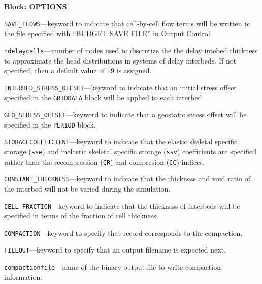 
\item \textbf{Block: OPTIONS}

\begin{description}
\item \texttt{SAVE\_FLOWS}---keyword to indicate that cell-by-cell flow terms will be written to the file specified with ``BUDGET SAVE FILE'' in Output Control.

\item \texttt{ndelaycells}---number of nodes used to discretize the the delay intebed thickness to approximate the head distributions in systems of delay interbeds. If not specified, then a default value of 19 is assigned.

\item \texttt{INTERBED\_STRESS\_OFFSET}---keyword to indicate that an initial stress offset specified in the \texttt{GRIDDATA} block will be applied to each interbed.

\item \texttt{GEO\_STRESS\_OFFSET}---keyword to indicate that a geostatic stress offset will be specified in the \texttt{PERIOD} block.

\item \texttt{STORAGECOEFFICIENT}---keyword to indicate that the elastic skeletal specific storage (\texttt{sse}) and inelastic skeletal specific storage (\texttt{ssv}) coefficients are specified rather than the recompression (\texttt{CR}) and compresion (\texttt{CC}) indices.

\item \texttt{CONSTANT\_THICKNESS}---keyword to indicate that the thickness and void ratio of the interbed will not be varied during the simulation.

\item \texttt{CELL\_FRACTION}---keyword to indicate that the thickness of interbeds will be specified in terms of the fraction of cell thickness.

\item \texttt{COMPACTION}---keyword to specify that record corresponds to the compaction.

\item \texttt{FILEOUT}---keyword to specify that an output filename is expected next.

\item \texttt{compactionfile}---name of the binary output file to write compaction information.


\end{description}
